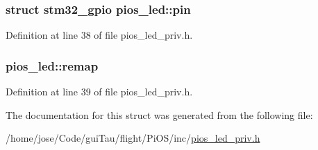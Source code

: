 \hypertarget{structpios__led_a11fcfad24672a8ba07ab81baea1dffaa}{
\subsubsection[{pin}]{\setlength{\rightskip}{0pt plus 5cm}struct {\bf stm32\-\_\-gpio} pios\-\_\-led\-::pin}}\label{structpios__led_a11fcfad24672a8ba07ab81baea1dffaa}


Definition at line 38 of file pios\-\_\-led\-\_\-priv.\-h.

\hypertarget{structpios__led_ab372d17fd1c41d5366ac92b402773710}{
\subsubsection[{remap}]{ pios\-\_\-led\-::remap}}\label{structpios__led_ab372d17fd1c41d5366ac92b402773710}


Definition at line 39 of file pios\-\_\-led\-\_\-priv.\-h.



The documentation for this struct was generated from the following file\-:\begin{DoxyCompactItemize}
\item 
/home/jose/\-Code/gui\-Tau/flight/\-Pi\-O\-S/inc/\hyperlink{pios__led__priv_8h}{pios\-\_\-led\-\_\-priv.\-h}\end{DoxyCompactItemize}
